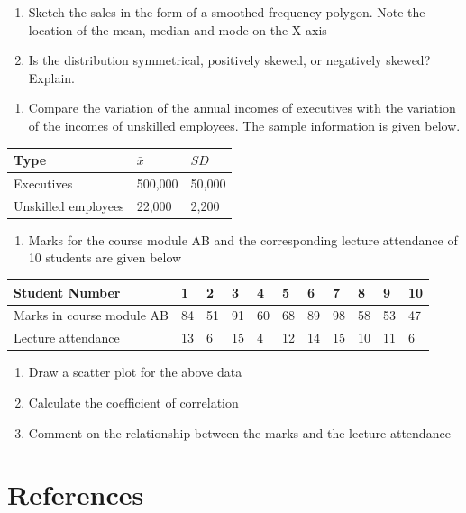 \documentclass[]{book}
\providecommand{\tightlist}{%
  \setlength{\itemsep}{0pt}\setlength{\parskip}{0pt}}
\begin{document}
\begin{enumerate}
\def\labelenumi{(\alph{enumi})}
\tightlist
\item
  Sketch the sales in the form of a smoothed frequency polygon. Note the location of the mean, median and mode on the X-axis
\item
  Is the distribution symmetrical, positively skewed, or negatively skewed? Explain.
\end{enumerate}

\begin{enumerate}
\def\labelenumi{\arabic{enumi}.}
\setcounter{enumi}{14}
\tightlist
\item
  Compare the variation of the annual incomes of executives with the variation of the incomes of unskilled employees. The sample information is given below.
\end{enumerate}

\begin{longtable}[]{@{}lll@{}}
\toprule
Type & \(\bar{x}\) & \(SD\)\tabularnewline
\midrule
\endhead
Executives & 500,000 & 50,000\tabularnewline
Unskilled employees & 22,000 & 2,200\tabularnewline
\bottomrule
\end{longtable}

\begin{enumerate}
\def\labelenumi{\arabic{enumi}.}
\setcounter{enumi}{15}
\tightlist
\item
  Marks for the course module AB and the corresponding lecture attendance of 10 students are given below
\end{enumerate}

\begin{longtable}[]{@{}lllllllllll@{}}
\toprule
Student Number & 1 & 2 & 3 & 4 & 5 & 6 & 7 & 8 & 9 & 10\tabularnewline
\midrule
\endhead
Marks in course module AB & 84 & 51 & 91 & 60 & 68 & 89 & 98 & 58 & 53 & 47\tabularnewline
Lecture attendance & 13 & 6 & 15 & 4 & 12 & 14 & 15 & 10 & 11 & 6\tabularnewline
\bottomrule
\end{longtable}

\begin{enumerate}
\def\labelenumi{(\alph{enumi})}
\tightlist
\item
  Draw a scatter plot for the above data
\item
  Calculate the coefficient of correlation
\item
  Comment on the relationship between the marks and the lecture attendance
\end{enumerate}

\hypertarget{references-4}{%
\section*{References}\label{references-4}}
\end{document}
